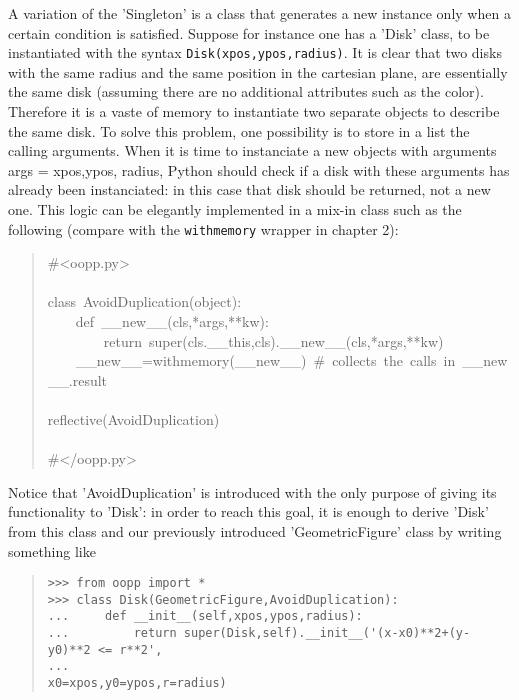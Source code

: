 \documentclass[10pt,english]{article}
\begin{document}
A variation of the 'Singleton' is a class that generates a new
instance only when a certain condition is satisfied. Suppose for instance
one has a 'Disk' class, to be instantiated with the syntax 
\texttt{Disk(xpos,ypos,radius)}.
It is clear that two disks with the same radius and the same position in
the cartesian plane, are essentially the same disk (assuming there are no
additional attributes such as the color). Therefore it is a vaste of memory
to instantiate two separate objects to describe the same disk. To solve
this problem, one possibility is to store in a list the calling arguments.
When it is time to instanciate a new objects with arguments args = xpos,ypos,
radius, Python should check if a disk with these arguments has already
been instanciated: in this case that disk should be returned, not a new
one. This logic can be elegantly implemented in a mix-in class such as the 
following (compare with the \texttt{withmemory} wrapper in chapter 2):
\begin{quote}
\begin{ttfamily}\begin{flushleft}
\mbox{{\#}<oopp.py>}\\
\mbox{}\\
\mbox{class~AvoidDuplication(object):}\\
\mbox{~~~~def~{\_}{\_}new{\_}{\_}(cls,*args,**kw):}\\
\mbox{~~~~~~~~return~super(cls.{\_}{\_}this,cls).{\_}{\_}new{\_}{\_}(cls,*args,**kw)~}\\
\mbox{~~~~{\_}{\_}new{\_}{\_}=withmemory({\_}{\_}new{\_}{\_})~{\#}~collects~the~calls~in~{\_}{\_}new{\_}{\_}.result}\\
\mbox{}\\
\mbox{reflective(AvoidDuplication)}\\
\mbox{}\\
\mbox{{\#}</oopp.py>}
\end{flushleft}\end{ttfamily}
\end{quote}

Notice that 'AvoidDuplication' is introduced with the only purpose of
giving its functionality to 'Disk': in order to reach this goal, it is enough 
to derive 'Disk' from this class and our previously
introduced 'GeometricFigure' class by writing something like
\begin{quote}
\begin{verbatim}>>> from oopp import *
>>> class Disk(GeometricFigure,AvoidDuplication): 
...     def __init__(self,xpos,ypos,radius):
...         return super(Disk,self).__init__('(x-x0)**2+(y-y0)**2 <= r**2', 
...                                          x0=xpos,y0=ypos,r=radius)\end{verbatim}
\end{quote}
\end{document}
